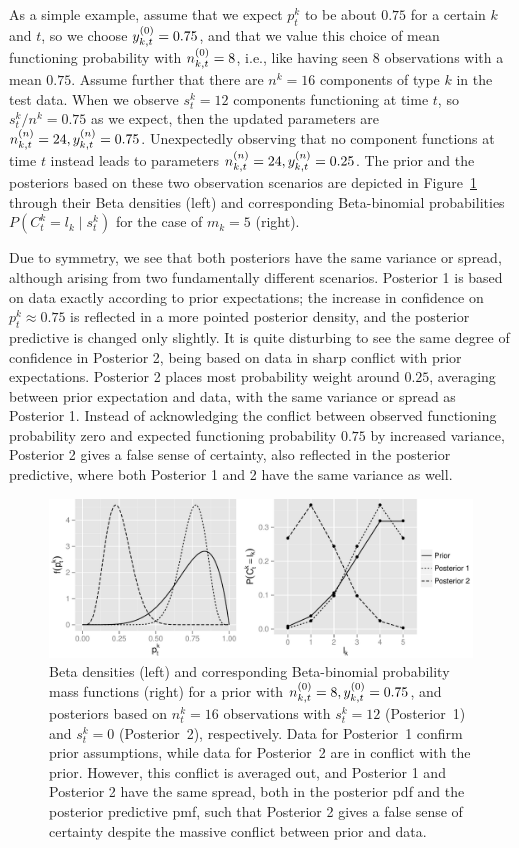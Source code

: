 \documentclass[authoryear, 12pt, a4paper]{elsarticle}
\newcommand{\ptk}{p^k_t}
\begin{document}
As a simple example, assume that we expect $\ptk$ to be about $0.75$ for a certain $k$ and $t$,
so we choose $y^{(0)}_{k,t} = 0.75$,
and that we value this choice of mean functioning probability with $n^{(0)}_{k,t} = 8$,
i.e., like having seen $8$ observations with a mean $0.75$.
Assume further that there are $n^k = 16$ components of type $k$ in the test data.
When we observe $s^k_t = 12$ components functioning at time $t$,
so $s^k_t/n^k = 0.75$ as we expect,
then the updated parameters are $n^{(n)}_{k,t} = 24, y^{(n)}_{k,t}=0.75$.
Unexpectedly observing that no component functions at time $t$ instead
leads to parameters $n^{(n)}_{k,t} = 24, y^{(n)}_{k,t}=0.25$.
The prior and the posteriors based on these two observation scenarios
are depicted in Figure~\ref{fig:singleprior-pdc}
through their Beta densities (left)
and corresponding Beta-binomial probabilities $P(C^k_t = l_k\mid s^k_t)$
for the case of $m_k = 5$ (right).

Due to symmetry, we see that both posteriors have the same variance or spread,
although arising from two fundamentally different scenarios.
Posterior 1 is based on data exactly according to prior expectations;
the increase in confidence on $\ptk \approx 0.75$
is reflected in a more pointed posterior density,
and the posterior predictive is changed only slightly.
It is quite disturbing to see the same degree of confidence in Posterior 2,
being based on data in sharp conflict with prior expectations.
Posterior 2 places most probability weight around $0.25$,
averaging between prior expectation and data,
with the same variance or spread as Posterior 1.
Instead of acknowledging the conflict between observed functioning probability zero
and expected functioning probability $0.75$ by increased variance,
Posterior 2 gives a false sense of certainty,
also reflected in the posterior predictive,
where both Posterior 1 and 2 have the same variance as well.

\begin{figure}
\includegraphics[width=\textwidth]{singleprior-pdc}
\caption{Beta densities (left) and corresponding Beta-binomial probability mass functions (right)
for a prior with $n^{(0)}_{k,t} = 8, y^{(0)}_{k,t} = 0.75$,
and posteriors based on $n^k_t=16$ observations with $s^k_t=12$ (Posterior~1) and $s^k_t=0$ (Posterior~2), respectively.
Data for Posterior~1 confirm prior assumptions,
while data for Posterior~2 are in conflict with the prior.
However, this conflict is averaged out,
and Posterior 1 and Posterior 2 have the same spread, both in the posterior pdf and the posterior predictive pmf,
such that Posterior 2 gives a false sense of certainty despite the massive conflict between prior and data.}
\label{fig:singleprior-pdc}
\end{figure}
\end{document}
